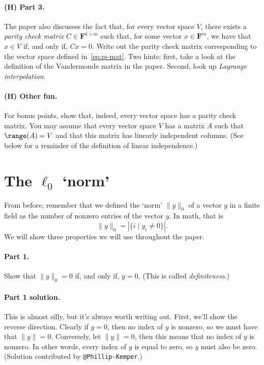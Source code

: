 \documentclass[12pt,hidelinks]{article}
\newcommand{\field}{\mathbf{F}}
\begin{document}
\paragraph{(H) Part 3.} The paper also discusses the fact that, for every
vector space $V$, there exists a \emph{parity check matrix} $C \in
\field^{k\times m}$ such that, for some vector $x \in \field^m$, we have that
$x \in V$ if, and only if, $Cx = 0$. Write out the parity check matrix
corresponding to the vector space defined in~\eqref{eq:rs-mat}.
Two hints: first, take a look at the definition of the Vandermonde matrix
in the paper. Second, look up \emph{Lagrange interpolation}.

\paragraph{(H) Other fun.} For bonus points, show that, indeed, every vector space
has a parity check matrix. You may assume that every vector space $V$ has a
matrix $A$ such that $\range(A) = V$ and that this matrix has linearly
independent columns. (See below for a reminder of the definition of linear
independence.)

\section{The $\ell_0$ `norm'}
From before, remember that we defined the `norm' $\|y\|_0$ of a vector $y$ in a
finite field as the number of nonzero entries of the vector $y$. In math,
that is
\[
    \|y\|_0 = |\{i\mid y_i \ne 0\}|.
\]
We will show three properties we will use throughout the paper.

\paragraph{Part 1.} Show that $\|y\|_0 = 0$ if, and only if, $y = 0$. (This
is called \emph{definiteness}.)


\begin{solution}

\paragraph{Part 1 solution.} This is almost silly, but it's always worth
writing out. First, we'll show the reverse direction. Clearly if $y=0$, then no
index of $y$ is nonzero, so we must have that $\|y\| = 0$. Conversely, let
$\|y\| = 0$, then this means that no index of $y$ is nonzero. In other words,
every index of $y$ is equal to zero, so $y$ must also be zero.
(Solution contributed by \verb|@Phillip-Kemper|.)
\end{solution}
\end{document}
